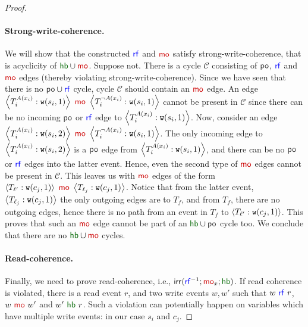 \begin{proof}
\paragraph*{Strong-write-coherence.} We will show that the constructed $\rf$ and $\mo$ satisfy strong-write-coherence, that is acyclicity of $\hb \cup
 \mo$. Suppose not. There is a cycle $\mathcal{C}$ consisting of $\po$, $\rf$ and $\mo$ edges (thereby violating strong-write-coherence). Since we have seen that there is no $\po \cup \rf$ cycle, cycle $\mathcal{C}$ should contain an $\mo$ edge.  An edge  $\tuple{T_{i}^{A(x_i)}: \wt(s_i, 1)} ~\mo~\tuple{T_i^{\neg{A(x_i)}}: \wt(s_i, 1)}$ cannot be present in $\mathcal{C}$ since there can be no incoming $\po$ or $\rf$ edge to $\left\langle T_{i}^{A(x_i)}: \mathtt{w}(s_i, 1)\right\rangle$. Now, consider an edge $\tuple{T_{i}^{A(x_i)}: \wt(s_i, 2)}~\mo~\allowbreak \tuple{T_{i}^{\neg{A(x_i)}}: \wt(s_i, 1)}$. 
  The only incoming edge to $\left\langle T_{i}^{A(x_i)}: \mathtt{w}(s_i, 2)\right\rangle$ is a $\po$ edge from $\left\langle T_{i}^{A(x_i)}: \mathtt{w}(s_i, 1)\right\rangle$, and there can be no $\po$ or $\rf$ edges into the latter event. Hence, even the second type of $\mo$ edges cannot be present in $\mathcal{C}$. 
This leaves us with $\mo$ edges of the form $\tuple{T_{\ell'}: \wt(c_j, 1)} ~\mo~\allowbreak  \tuple{T_{\ell_j}: \wt(c_j,1)}$. Notice that from the latter event, $\left\langle T_{\ell_j}: \mathtt{w}(c_j, 1)\right\rangle$ the only outgoing edges are to $T_f$, and from $T_f$, there are no outgoing edges, hence there is no path from an event in $T_f$ to $\left\langle T_{\ell'}: \mathtt{w}(c_j, 1)\right\rangle$. This proves that such an $\mo$ edge cannot be part of an $\hb \cup \po$ cycle too. We conclude that there are no $\hb \cup \mo$ cycles. 


    \paragraph*{Read-coherence.} Finally, we need to prove read-coherence, i.e., $\irr(\rf^{-1}; \mo_x; \hb)$. If read coherence is violated, there is a read event $r$, and two write events $w, w'$ such that $w~\rf~r$, $w~\mo~w'$ and $w'~\hb~r$. Such a violation can potentially happen on variables which have multiple write events: in our case $s_i$ and $c_j$.
    

\end{proof}
